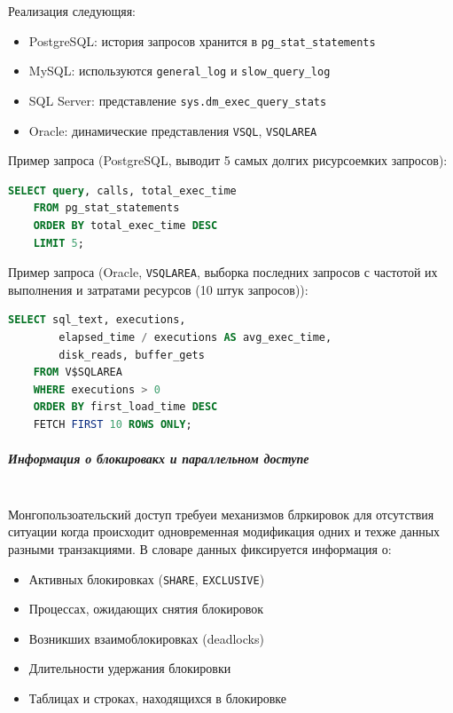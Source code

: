 Реализация следующяя:
\begin{itemize}
    \item PostgreSQL: история запросов хранится в \texttt{pg\_stat\_statements} \autocite{PgStatStatements1}
    \item MySQL: используются \texttt{general\_log} и \texttt{slow\_query\_log} \autocite{Mysqldoc3}
    \item SQL Server: представление \texttt{sys.dm\_exec\_query\_stats} \autocite{MicrosoftLearnSQLserverQueryStat}
    \item Oracle: динамические представления \texttt{V\textdollar SQL}, \texttt{V\textdollar SQLAREA} \autocite[c.9 §46-49, c.9 §71]{oracledbdoc2}
\end{itemize}

Пример запроса (PostgreSQL, выводит 5 самых долгих рисурсоемких запросов):
\begin{lstlisting}[language=SQL]
    SELECT query, calls, total_exec_time 
    FROM pg_stat_statements 
    ORDER BY total_exec_time DESC 
    LIMIT 5;                 
\end{lstlisting}

Пример запроса (Oracle, \texttt{V\textdollar SQLAREA}, выборка последних запросов с частотой их выполнения и затратами ресурсов (10 штук запросов)):
\begin{lstlisting}[language=SQL]
    SELECT sql_text, executions, 
        elapsed_time / executions AS avg_exec_time, 
        disk_reads, buffer_gets 
    FROM V$SQLAREA 
    WHERE executions > 0 
    ORDER BY first_load_time DESC 
    FETCH FIRST 10 ROWS ONLY;
\end{lstlisting}

\subparagraph{Информация о блокировакх и параллельном доступе} ~\\

Монгопользоательский доступ требуеи механизмов блркировок для отсутствия ситуации когда происходит одновременная модификация одних и техже данных разными транзакциями. В словаре данных фиксируется информация о:
\begin{itemize}
    \item Активных блокировках (\texttt{SHARE}, \texttt{EXCLUSIVE})
    \item Процессах, ожидающих снятия блокировок
    \item Возникших взаимоблокировках (deadlocks)
    \item Длительности удержания блокировки
    \item Таблицах и строках, находящихся в блокировке
\end{itemize}

